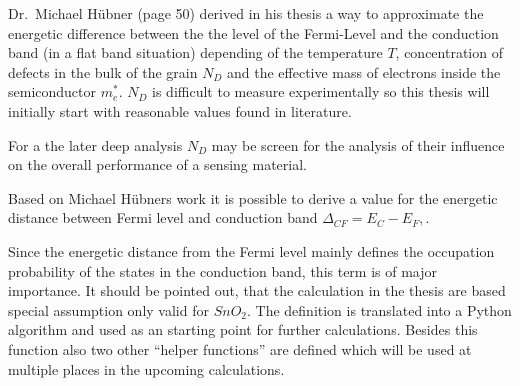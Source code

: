 \documentclass[11pt]{article}
\begin{document}
Dr.~Michael Hübner (page 50) derived in his thesis a way to approximate
the energetic difference between the the level of the Fermi-Level and
the conduction band (in a flat band situation) depending of the
temperature \(T\), concentration of defects in the bulk of the grain
\(N_D\) and the effective mass of electrons inside the semiconductor
\(m_e^*\). \(N_D\) is difficult to measure experimentally so this thesis
will initially start with reasonable values found in literature.

For a the later deep analysis \(N_D\) may be screen for the analysis of
their influence on the overall performance of a sensing material.

Based on Michael Hübners work it is possible to derive a value for the
energetic distance between Fermi level and conduction band
\(\Delta_{CF} = E_C-E_F,\).

Since the energetic distance from the Fermi level mainly defines the
occupation probability of the states in the conduction band, this term
is of major importance. It should be pointed out, that the calculation
in the thesis are based special assumption only valid for \(SnO_2\). The
definition is translated into a Python algorithm and used as an starting
point for further calculations. Besides this function also two other
``helper functions'' are defined which will be used at multiple places
in the upcoming calculations.
\end{document}
